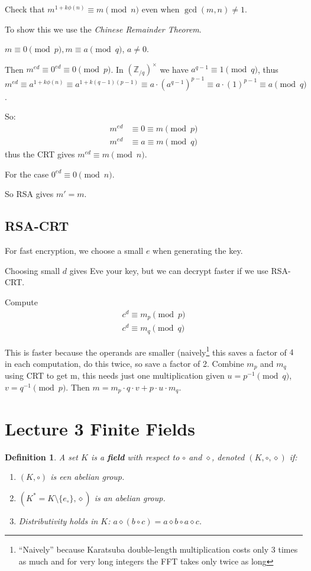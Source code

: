 \documentclass{article}
\newtheorem{definition}{Definition}
\newcommand{\ZZ}{\mathbb{Z}}
\newcommand{\ZZx}[1]{(\ZZ_{/#1})^\times}
\begin{document}
Check that $m^{1 + k\phi(n)} \equiv m \pmod{n}$ even when $\gcd(m, n) \ne 1$.

To show this we use the \emph{Chinese Remainder Theorem}.

$m \equiv 0 \pmod{p}, m \equiv a \pmod{q}$, $a \ne 0$.

Then $m^{ed} \equiv 0^{ed} \equiv 0 \pmod{p}$. In $\ZZx{q}$ we 
have $a^{q-1} \equiv 1 \pmod{q}$, thus $m^{ed} \equiv a^{1 + k\phi(n)} \equiv a^{1 + k(q-1)(p-1)}
\equiv a \cdot (a^{q-1})^{p-1} \equiv a \cdot (1)^{p-1} \equiv a \pmod{q}$.

So:
\begin{align*}
    m^{ed} &\equiv 0 \equiv m \pmod p \\
    m^{ed} &\equiv a \equiv m \pmod q 
\end{align*}
thus the CRT gives $m^{ed} \equiv m \pmod{n}$.

For the case $0^{ed} \equiv 0 \pmod{n}$.

So RSA gives $m' = m$.

\subsection{RSA-CRT}

For fast encryption, we choose a small $e$ when generating the key.

Choosing small $d$ gives Eve your key, but we can decrypt faster if we
use RSA-CRT.

Compute \begin{align*}
    c^d \equiv m_p \pmod p \\
    c^d \equiv m_q \pmod q
\end{align*}

This is faster because the operands are smaller (naively\footnote{``Naively''
because Karatsuba double-length multiplication costs only 3 times as much and
for very long integers the FFT takes only twice as long} this saves a factor of
$4$ in each computation, do this twice, so save a factor of 2. Combine $m_p$ and
$m_q$ using CRT to get m, this needs just one multiplication given $u = p^{-1}
\pmod q$, $v = q^{-1} \pmod p$. Then $m = m_p \cdot q \cdot v + p \cdot u \cdot
m_q$.

\section{Lecture 3 Finite Fields}

\begin{definition}
    A set $K$ is a \textbf{field} with respect to $\circ$ and $\diamond$, denoted $(K, \circ, \diamond)$ if:

    \begin{enumerate}
        \item $(K, \circ)$ is een abelian group.
        \item $(K^* = K\setminus \{e_\circ\}, \diamond)$ is an abelian group.
        \item Distributivity holds in $K$: $a \diamond (b \circ c) = a \diamond b \circ a \diamond c$.
    \end{enumerate}

\end{definition}
\end{document}
